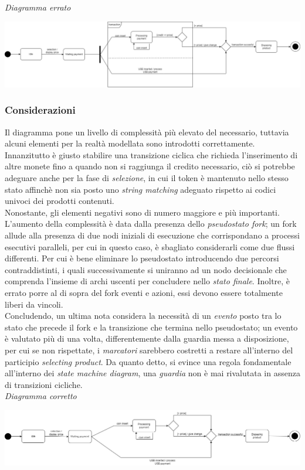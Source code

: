 \documentclass{article}
\begin{document}
\textit{Diagramma errato}
\begin{center}
\includegraphics[width=1\textwidth]{foto 6.png}    
\end{center}

\subsubsection*{Considerazioni}
Il diagramma pone un livello di complessità più elevato del necessario, tuttavia alcuni elementi per la realtà modellata sono introdotti correttamente. Innanzitutto è giusto stabilire una transizione ciclica che richieda l'inserimento di altre monete fino a quando non si raggiunga il credito necessario, ciò si potrebbe adeguare anche per la fase di \textit{selezione}, in cui il token è mantenuto nello stesso stato affinchè non sia posto uno \textit{string matching} adeguato rispetto ai codici univoci dei prodotti contenuti.\vspace*{14pt}\\
Nonostante, gli elementi negativi sono di numero maggiore e più importanti. L'aumento della complessità è data dalla presenza dello \textit{pseudostato fork}; un fork allude alla presenza di due nodi iniziali di esecuzione che corrispondano a processi esecutivi paralleli, per cui in questo caso, è sbagliato considerarli come due flussi differenti. Per cui è bene eliminare lo pseudostato introducendo due percorsi contraddistinti, i quali successivamente si uniranno ad un nodo decisionale che comprenda l'insieme di archi uscenti per concludere nello \textit{stato finale}. Inoltre, è errato porre al di sopra del fork eventi e azioni, essi devono essere totalmente liberi da vincoli.\vspace*{14pt}\\
Concludendo, un ultima nota considera la necessità di un \textit{evento} posto tra lo stato che precede il fork e la transizione che termina nello pseudostato; un evento è valutato più di una volta, differentemente dalla guardia messa a disposizione, per cui se non rispettate, i \textit{marcatori} sarebbero costretti a restare all'interno del participio \textit{selecting product}. Da quanto detto, si evince una regola fondamentale all'interno dei \textit{state machine diagram}, una \textit{guardia} non è mai rivalutata in assenza di transizioni cicliche.\vspace*{14pt}\\
\textit{Diagramma corretto}
\begin{center}
    \includegraphics[width=1\textwidth]{foto 7.png}
\end{center}
\end{document}
